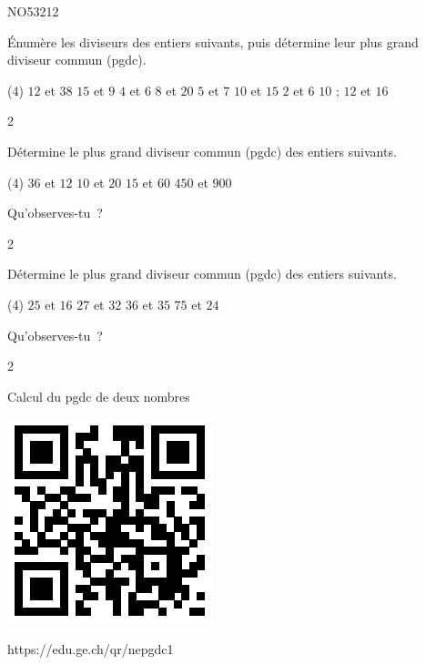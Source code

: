 \documentclass[a4paper,12pt]{report}
\begin{document}
\begin{exol}{NO53}{21}{2}
\end{exol}

\begin{exo}{
    Énumère les diviseurs des entiers suivants, puis détermine leur plus grand diviseur commun (pgdc).
\begin{tasks}[after-item-skip=0.2em](4)
    \task $12$ et $38$
    \task $15$ et $9$
    \task $4$ et $6$
    \task $8$ et $20$
    \task $5$ et $7$
    \task $10$ et $15$
    \task $2$ et $6$
    \task $10$ ; $12$ et $16$
\end{tasks}
}{2}\end{exo}



\begin{exo}{
    Détermine le plus grand diviseur commun (pgdc) des entiers suivants.
\begin{tasks}(4)
        \task $36$ et $12$
        \task $10$ et $20$
        \task $15$ et $60$
        \task $450$ et $900$
\end{tasks}

Qu'observes-tu~?
}{2}\end{exo}







\begin{exo}{
    Détermine le plus grand diviseur commun (pgdc) des entiers suivants.
\begin{tasks}(4)
        \task $25$ et $16$
        \task $27$ et $32$
        \task $36$ et $35$
        \task $75$ et $24$
\end{tasks}
Qu'observes-tu~?
}{2}\end{exo}


\begin{qmun}{Calcul du pgdc de deux nombres}{
		\begin{center}
\includegraphics[scale=1]{media/qr/nepgdc1 }

\tiny{{https://edu.ge.ch/qr/nepgdc1}}
		\end{center}
	}
\end{qmun}
\end{document}
